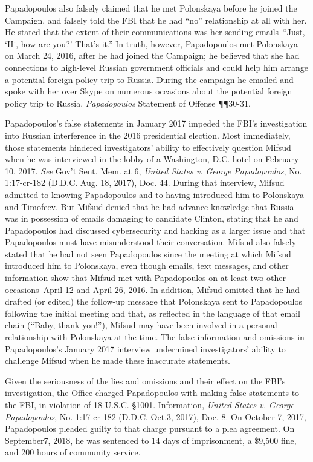 Papadopoulos also falsely claimed that he met Polonskaya before he joined the Campaign, and falsely told the FBI that he had ``no'' relationship at all with her.
He stated that the extent of their communications was her sending emails--``Just, `Hi, how are you?' That's it.''
In truth, however, Papadopoulos met Polonskaya on March 24, 2016, after he had joined the Campaign; he believed that she had connections to high-level Russian government officials and could help him arrange a potential foreign policy trip to Russia.
During the campaign he emailed and spoke with her over Skype on numerous occasions about the potential foreign policy trip to Russia.
\textit{Papadopoulos} Statement of Offense \P\P 30-31.

Papadopoulos's false statements in January 2017 impeded the FBI's investigation into Russian interference in the 2016 presidential election.
Most immediately, those statements hindered investigators' ability to effectively question Mifsud when he was interviewed in the lobby of a Washington, D.C. hotel on February 10, 2017.
\textit{See} Gov't Sent. Mem. at 6, \textit{United States v. George Papadopoulos}, No. 1:17-cr-182 (D.D.C. Aug. 18, 2017), Doc. 44.
During that interview, Mifsud admitted to knowing Papadopoulos and to having introduced him to Polonskaya and Timofeev.
But Mifsud denied that he had advance knowledge that Russia was in possession of emails damaging to candidate Clinton, stating that he and Papadopoulos had discussed cybersecurity and hacking as a larger issue and that Papadopoulos must have misunderstood their conversation.
Mifsud also falsely stated that he had not seen Papadopoulos since the meeting at which Mifsud introduced him to Polonskaya, even though emails, text messages, and other information show that Mifsud met with Papadopoulos on at least two other occasions--April 12 and April 26, 2016.
In addition, Mifsud omitted that he had drafted (or edited) the follow-up message that Polonskaya sent to Papadopoulos following the initial meeting and that, as reflected in the language of that email chain (``Baby, thank you!''), Mifsud may have been involved in a personal relationship with Polonskaya at the time.
The false information and omissions in Papadopoulos's January 2017 interview undermined investigators' ability to challenge Mifsud when he made these inaccurate statements.

Given the seriousness of the lies and omissions and their effect on the FBI's investigation, the Office charged Papadopoulos with making false statements to the FBI, in violation of 18 U.S.C. \S 1001.
Information, \textit{United States v. George Papadopoulos}, No. 1:17-cr-182 (D.D.C. Oct.3, 2017), Doc. 8.
On October 7, 2017, Papadopoulos pleaded guilty to that charge pursuant to a plea agreement.
On September7, 2018, he was sentenced to 14 days of imprisonment, a \$9,500 fine, and 200 hours of community service.

